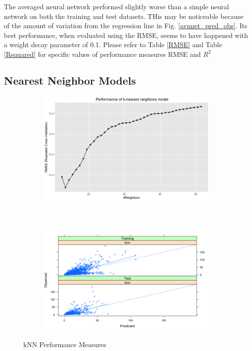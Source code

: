 \documentclass[letterpaper,12pt,titlepage,oneside,final]{report}
\begin{document}
            The averaged neural network performed slightly worse than a simple neural network on both the training and test datasets. THis may be noticeable because of the amount of variation from the regression line in Fig. \ref{avnnet_pred_obs}. Its best performance, when evaluated using the RMSE, seems to have happened with a weight decay parameter of 0.1. Please refer to Table \ref{RMSE} and Table \ref{Rsquared} for specific values of performance measures RMSE and $R^2$
        \subsection {Nearest Neighbor Models}
            \begin{figure}[!ht]
            \begin{subfigure}[t]{0.5\textwidth}
                \centering
                \includegraphics[width=1.1\textwidth]{knnresults}
                \caption{}
                \label{knnresults}
            \end{subfigure}%
                ~ 
            \begin{subfigure}[t]{0.5\textwidth}
                \centering
                \includegraphics[width=1.1\textwidth]{knn_pred_obs}
                \caption{}
                \label{knn_pred_obs}
            \end{subfigure}
            \caption{kNN Performance Measures}
            \end{figure}
\end{document}
